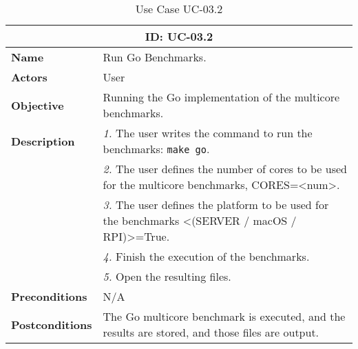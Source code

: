 \begin{table}[H]
    \centering
    \begin{tabular}{l p{10cm}}
        \toprule
        \multicolumn{2}{c}{\textbf{ID: UC-03.2}} \\
        \toprule
        \textbf{Name}                         &  Run Go Benchmarks. \\
        \textbf{Actors}                       &  User \\
        \textbf{Objective}                    &  Running the Go implementation of the multicore benchmarks. \\
        \multirow{1}{*}{\textbf{Description}} & \textsl{1.} The user writes the command to run the benchmarks: \texttt{make go}.\\
                                              & \textsl{2.} The user defines the number of cores to be used for the multicore benchmarks, CORES=<num>.\\
                                              & \textsl{3.} The user defines the platform to be used for the benchmarks <(SERVER / macOS / RPI)>=True.\\
                                              & \textsl{4.} Finish the execution of the benchmarks.\\
                                              & \textsl{5.} Open the resulting files.\\ 
        \textbf{Preconditions}                &  N/A \\
        \textbf{Postconditions}               &  The Go multicore benchmark is executed, and the results are stored, and those files are output. \\
    \end{tabular}
    \caption{Use Case UC-03.2}
    \label{tab:uc-03.2}
\end{table}


